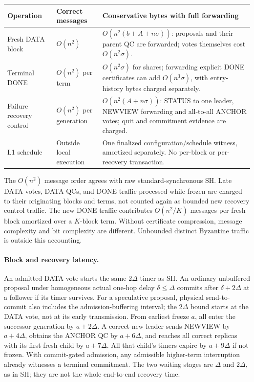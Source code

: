\documentclass[11pt,a4paper]{article}
\begin{document}
\begin{center}\small
\begin{tabularx}{\linewidth}{@{}p{.20\linewidth}p{.19\linewidth}Y@{}}
\toprule
Operation & Correct messages & Conservative bytes with full forwarding\\
\midrule
Fresh DATA block & $O(n^2)$ &
$O(n^2(b+A+n\sigma))$: proposals and their parent QC are forwarded;
votes themselves cost $O(n^2\sigma)$.\\
Terminal DONE & $O(n^2)$ per term &
$O(n^2\sigma)$ for shares; forwarding explicit DONE certificates can
add $O(n^3\sigma)$, with entry-history bytes charged separately.\\
Failure recovery control & $O(n^2)$ per generation &
$O(n^2(A+n\sigma))$: STATUS to one leader, NEWVIEW forwarding and
all-to-all ANCHOR votes; quit and commitment evidence are charged.\\
L1 schedule & Outside local execution &
One finalized configuration/schedule witness, amortized separately.
No per-block or per-recovery transaction.\\
\bottomrule
\end{tabularx}
\end{center}
The $O(n^2)$ message order agrees with raw standard-synchronous SH.
Late DATA votes, DATA QCs, and DONE traffic processed while frozen are
charged to their originating blocks and terms, not counted again as
bounded new recovery control traffic.
The new DONE traffic contributes $O(n^2/K)$ messages per fresh block
amortized over a $K$-block term. Without certificate compression, message
complexity and bit complexity are different. Unbounded distinct Byzantine
traffic is outside this accounting.

\paragraph{Block and recovery latency.}
An admitted DATA vote starts the same $2\Delta$ timer as SH.
An ordinary unbuffered proposal under homogeneous actual one-hop delay
$\delta\le\Delta$ commits after $\delta+2\Delta$ at a follower if its
timer survives. For a speculative proposal, physical send-to-commit also
includes the admission-buffering interval; the $2\Delta$ bound starts at
the DATA vote, not at its early transmission.
From earliest freeze $a$, all enter the successor generation by
$a+2\Delta$. A correct new leader sends NEWVIEW by $a+4\Delta$, obtains
the ANCHOR QC by $a+6\Delta$, and reaches all correct replicas with its
first fresh child by $a+7\Delta$. All that child's timers expire by
$a+9\Delta$ if not frozen. With commit-gated admission, any admissible
higher-term interruption already witnesses a terminal commitment.
The two waiting stages are $\Delta$ and $2\Delta$, as in SH; they are
not the whole end-to-end recovery time.
\end{document}
